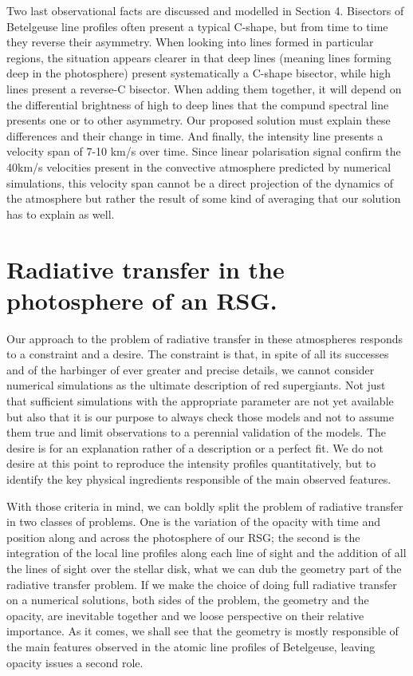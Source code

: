 \documentclass{/Users/art2/TeX/aanda/aa}
\begin{document}
Two last observational facts are discussed and modelled in Section 4. Bisectors of Betelgeuse line profiles often present a typical C-shape, but 
from time to time they reverse their asymmetry. When looking into lines formed in particular regions, the situation appears clearer in that deep 
lines (meaning lines forming deep in the photosphere) present systematically a C-shape bisector, while high lines present a reverse-C bisector. When
adding them together, it will depend on the differential brightness of high to deep lines that the compund spectral line presents one or to other asymmetry.
Our proposed solution must explain these differences and their change in time. And finally, the intensity line presents a velocity span of 7-10 km/s 
over time. Since linear polarisation signal confirm the 40km/s velocities present in the convective atmosphere predicted by numerical simulations, this 
velocity span cannot be a direct projection of the dynamics of the atmosphere but rather the result of some kind of averaging that our solution 
has to explain as well.




\section{Radiative transfer in the photosphere of an RSG.}

Our approach to the problem of radiative transfer in these atmospheres responds to a constraint and a desire. The constraint is that, in spite 
of all its successes and of the harbinger of ever greater and precise details, we cannot consider numerical simulations as the ultimate description 
of red supergiants. Not just that sufficient simulations with the appropriate parameter are not yet available but also that it is our purpose to always 
check those models and not to assume them true and limit observations to a perennial validation of the models. The desire is for an explanation rather 
of a description or a perfect fit. We do not desire at this point to reproduce the intensity profiles quantitatively, but to identify the key physical 
ingredients responsible of the main observed features. 

With those criteria in mind, we can boldly split the problem of radiative transfer in two classes of problems. One is the variation of the opacity 
with time and position along and across the photosphere of our RSG; the second is the integration of the local line profiles along each line of sight 
and the addition of all the lines of sight over the stellar disk, what we can dub the geometry part of the radiative transfer problem. If we make 
the choice of doing full radiative transfer on a numerical solutions, both sides of the problem, the geometry and the opacity, are inevitable 
together and we loose perspective on their relative importance. As it comes, we shall see that the geometry is mostly responsible of the main features 
observed in the atomic line profiles of Betelgeuse, leaving opacity issues a second role. 
\end{document}
